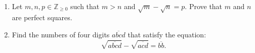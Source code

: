 \ 

\begin{enumerate}[label = (\alph*)]
	\item 
	Let $ m,n,p\in\mathbb{Z}_{\ge 0} $ such that $ m>n $ and $ \sqrt{m} -\sqrt n=p. $ Prove that $ m $ and $ n $ are perfect squares.

	\item
	Find the numbers of four digits $ \overline{abcd} $ that satisfy the equation:
\[ \sqrt {\overline{abcd} } -\sqrt{\overline{acd}} =\overline{bb}. \]
\end{enumerate}
